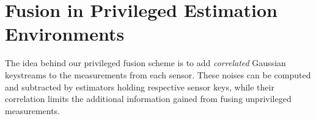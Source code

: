 % 
%                                                                                             
%                                                                                             
%                                                                                             
% 

\section{Fusion in Privileged Estimation Environments}\label{sec:priv_estimation:privileged_fusion}
The idea behind our privileged fusion scheme is to add \textit{correlated} Gaussian keystreams to the measurements from each sensor. These noises can be computed and subtracted by estimators holding respective sensor keys, while their correlation limits the additional information gained from fusing unprivileged measurements. 

% 
% 

